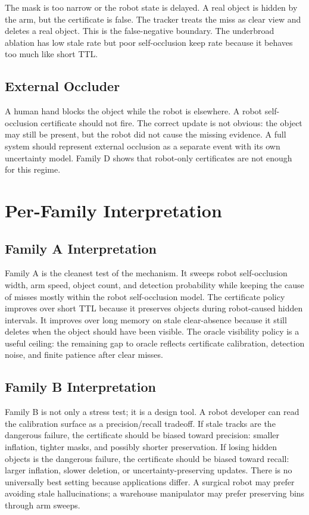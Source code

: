 \documentclass{article}
\begin{document}
The mask is too narrow or the robot state is delayed. A real object is hidden by
the arm, but the certificate is false. The tracker treats the miss as clear
view and deletes a real object. This is the false-negative boundary. The
underbroad ablation has low stale rate but poor self-occlusion keep rate because
it behaves too much like short TTL.

\subsection{External Occluder}

A human hand blocks the object while the robot is elsewhere. A robot
self-occlusion certificate should not fire. The correct update is not obvious:
the object may still be present, but the robot did not cause the missing
evidence. A full system should represent external occlusion as a separate event
with its own uncertainty model. Family D shows that robot-only certificates are
not enough for this regime.

\section{Per-Family Interpretation}

\subsection{Family A Interpretation}

Family A is the cleanest test of the mechanism. It sweeps robot self-occlusion
width, arm speed, object count, and detection probability while keeping the
cause of misses mostly within the robot self-occlusion model. The certificate
policy improves over short TTL because it preserves objects during robot-caused
hidden intervals. It improves over long memory on stale clear-absence because
it still deletes when the object should have been visible. The oracle visibility
policy is a useful ceiling: the remaining gap to oracle reflects certificate
calibration, detection noise, and finite patience after clear misses.

\subsection{Family B Interpretation}

Family B is not only a stress test; it is a design tool. A robot developer can
read the calibration surface as a precision/recall tradeoff. If stale tracks
are the dangerous failure, the certificate should be biased toward precision:
smaller inflation, tighter masks, and possibly shorter preservation. If losing
hidden objects is the dangerous failure, the certificate should be biased toward
recall: larger inflation, slower deletion, or uncertainty-preserving updates.
There is no universally best setting because applications differ. A surgical
robot may prefer avoiding stale hallucinations; a warehouse manipulator may
prefer preserving bins through arm sweeps.
\end{document}
